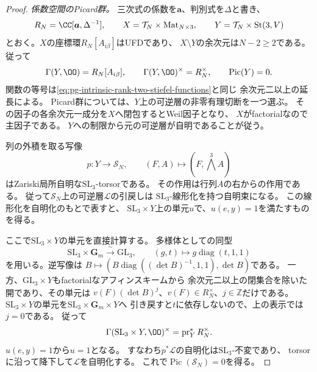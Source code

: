 \begin{proof}
\emph{係数空間のPicard群。}
三次式の係数を$\boldsymbol a$、判別式を$\Delta$と書き、
\begin{equation}
 R_N=\CC[\boldsymbol a,\Delta^{-1}],\qquad
 X=\mathcal T_N\times\operatorname{Mat}_{N\times3},\qquad
 Y=\mathcal T_N\times\operatorname{St}(3,V)
 \label{eq:pg-intrinsic-gerbe-stiefel-cover}
\end{equation}
とおく。$X$の座標環$R_N[A_{i\beta}]$はUFDであり、
$X\setminus Y$の余次元は$N-2\ge2$である。
従って
\begin{equation}
 \Gamma(Y,\OO)=R_N[A_{i\beta}],\qquad
 \Gamma(Y,\OO)^\times=R_N^\times,\qquad
 \operatorname{Pic}(Y)=0.
 \label{eq:pg-intrinsic-gerbe-stiefel-picard}
\end{equation}
関数の等号は\eqref{eq:pg-intrinsic-rank-two-stiefel-functions}と同じ
余次元二以上の延長による。
Picard群については、$Y$上の可逆層の非零有理切断を一つ選ぶ。
その因子の各余次元一成分を$X$へ閉包するとWeil因子となり、
$X$がfactorialなので主因子である。
$Y$への制限から元の可逆層が自明であることが従う。

列の外積を取る写像
\begin{equation}
 p:Y\longrightarrow\mathcal S_N,\qquad
 (F,A)\longmapsto(F,\textstyle\bigwedge^3A)
 \label{eq:pg-intrinsic-gerbe-sl3-torsor}
\end{equation}
はZariski局所自明な$\mathrm{SL}_3$-torsorである。
その作用は行列$A$の右からの作用である。
従って$\mathcal S_N$上の可逆層$\mathcal L$の引戻しは
$\mathrm{SL}_3$-線形化を持つ自明束になる。
この線形化を自明化のもとで表すと、
$\mathrm{SL}_3\times Y$上の単元$u$で、$u(e,y)=1$を満たすものを得る。

ここで$\mathrm{SL}_3\times Y$の単元を直接計算する。
多様体としての同型
\begin{equation}
 \mathrm{SL}_3\times\mathbf G_m\xrightarrow{\ \sim\ }\mathrm{GL}_3,
 \qquad (g,t)\longmapsto g\operatorname{diag}(t,1,1)
 \label{eq:pg-intrinsic-gerbe-gl3-variety}
\end{equation}
を用いる。逆写像は
$B\mapsto(B\operatorname{diag}((\det B)^{-1},1,1),\det B)$である。
一方、$\mathrm{GL}_3\times Y$もfactorialなアフィンスキームから
余次元二以上の閉集合を除いた開であり、その単元は
$v(F)(\det B)^j$、$v(F)\in R_N^\times$、$j\in\mathbb Z$だけである。
$\mathrm{SL}_3\times Y$の単元を$\mathrm{SL}_3\times\mathbf G_m\times Y$へ
引き戻すと$t$に依存しないので、上の表示では$j=0$である。
従って
\begin{equation}
 \Gamma(\mathrm{SL}_3\times Y,\OO)^\times
      =\operatorname{pr}_Y^*R_N^\times.
 \label{eq:pg-intrinsic-gerbe-sl3-units}
\end{equation}
$u(e,y)=1$から$u=1$となる。
すなわち$p^*\mathcal L$の自明化は$\mathrm{SL}_3$-不変であり、
torsorに沿って降下して$\mathcal L$を自明化する。
これで$\operatorname{Pic}(\mathcal S_N)=0$を得る。


\end{proof}
